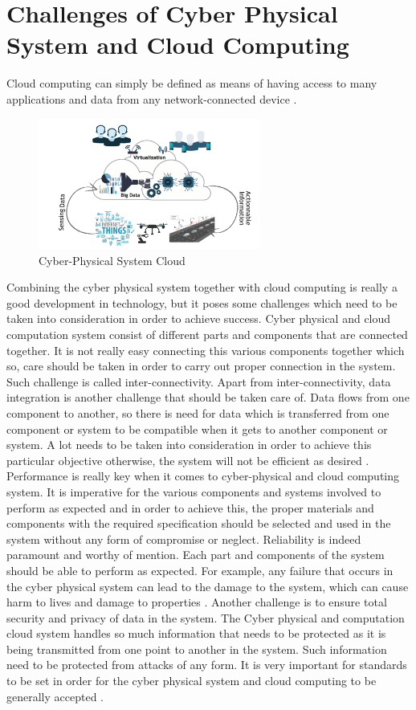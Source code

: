 \documentclass[english]{lni}
\begin{document}
\section{Challenges of Cyber Physical System and Cloud Computing}
Cloud computing can simply be defined as means of having access to many applications and data from any network-connected device \cite{b3}.

\begin{figure}[h]
    \centering
    \includegraphics[width=0.65\textwidth]{Images/cpss.png}
    \caption{Cyber-Physical System Cloud \cite{b3}}
    \label{fig:cpss}
\end{figure}
Combining the cyber physical system together with cloud computing is really a good development in technology, but it poses some challenges which need to be taken into consideration in order to achieve success.
Cyber physical and cloud computation system consist of different parts and components that are connected together. It is not really easy connecting this various components together which so, care should be taken in order to carry out proper connection in the system. Such challenge is called inter-connectivity.
Apart from inter-connectivity, data integration is another challenge that should be taken care of. Data flows from one component to another, so there is need for data which is transferred from one component or system to be compatible when it gets to another component or system. A lot needs to be taken into consideration in order to achieve this particular objective otherwise, the system will not be efficient as desired \cite{b3}. Performance is really key when it comes to cyber-physical and cloud computing system. It is imperative for the various components and systems involved  to perform as expected and in order to achieve this, the proper materials and components with the required specification should be selected and used in the system without any form of compromise or neglect. Reliability is indeed paramount and worthy of mention. Each part and components of the system should be able to perform as expected. For example, any failure that occurs in the cyber physical system can lead to the damage to the system, which can cause harm to lives and damage to properties \cite{copyurl3}. Another challenge is to ensure total security and privacy of data in the system. The Cyber physical and computation cloud system handles so much information that needs to be protected as it is being transmitted from one point to another in the system.  Such information need to be protected from attacks of any form. It is very important for standards to be set in order for the cyber physical system and cloud computing to be generally accepted \cite{b3}.
\end{document}
